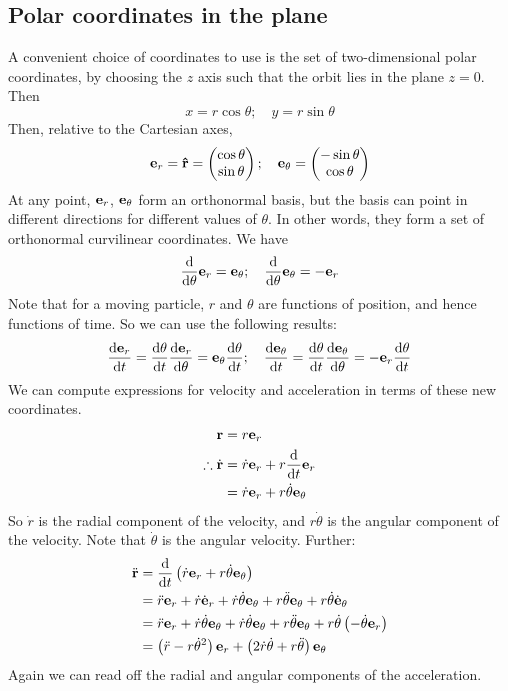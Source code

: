 \subsection{Polar coordinates in the plane}
A convenient choice of coordinates to use is the set of two-dimensional polar coordinates, by choosing the \(z\) axis such that the orbit lies in the plane \(z=0\).
Then
\[
	x = r\cos\theta;\quad y = r\sin\theta
\]
Then, relative to the Cartesian axes,
\[
	\vb e_r = \vu{r} = \begin{pmatrix}
		\cos\theta \\ \sin\theta
	\end{pmatrix};\quad \vb e_\theta = \begin{pmatrix}
		-\sin\theta \\ \cos\theta
	\end{pmatrix}
\]
At any point, \(\vb e_r\), \(\vb e_\theta\) form an orthonormal basis, but the basis can point in different directions for different values of \(\theta\).
In other words, they form a set of orthonormal curvilinear coordinates.
We have
\[
	\frac{\dd}{\dd{\theta}}\vb e_r = \vb e_\theta;\quad \frac{\dd}{\dd{\theta}}\vb e_\theta = -\vb e_r
\]
Note that for a moving particle, \(r\) and \(\theta\) are functions of position, and hence functions of time.
So we can use the following results:
\[
	\frac{\dd \vb e_r}{\dd{t}} = \frac{\dd{\theta}}{\dd{t}} \frac{\dd \vb e_r}{\dd{\theta}} = \vb e_\theta \frac{\dd{\theta}}{\dd{t}};\quad \frac{\dd \vb e_\theta}{\dd{t}} = \frac{\dd{\theta}}{\dd{t}} \frac{\dd \vb e_\theta}{\dd{\theta}} = -\vb e_r \frac{\dd{\theta}}{\dd{t}}
\]
We can compute expressions for velocity and acceleration in terms of these new coordinates.
\begin{align*}
	\vb r                  & = r \vb e_r                                    \\
	\therefore \dot{\vb r} & = \dot r \vb e_r + r \frac{\dd}{\dd{t}}\vb e_r \\
	                       & = \dot r \vb e_r + r \dot\theta \vb e_\theta
\end{align*}
So \(\dot r\) is the radial component of the velocity, and \(r\dot\theta\) is the angular component of the velocity.
Note that \(\dot\theta\) is the angular velocity.
Further:
\begin{align*}
	\ddot{\vb r} & = \frac{\dd}{\dd{t}}\left( \dot r \vb e_r + r \dot \theta \vb e_\theta \right)                                                                                        \\
	             & = \ddot r \vb e_r + \dot r \dot{\vb e}_r + \dot r \dot \theta \vb e_\theta + r \ddot \theta \vb e_\theta + r \dot \theta \dot{\vb e}_\theta                           \\
	             & = \ddot r \vb e_r + \dot r \dot \theta \vb e_\theta + \dot r \dot \theta \vb e_\theta + r \ddot \theta \vb e_\theta + r \dot \theta \left(-\dot \theta \vb e_r\right) \\
	             & = \left(\ddot r - r \dot \theta^2\right) \vb e_r + \left(2\dot r\dot \theta + r\ddot \theta\right) \vb e_\theta
\end{align*}
Again we can read off the radial and angular components of the acceleration.

